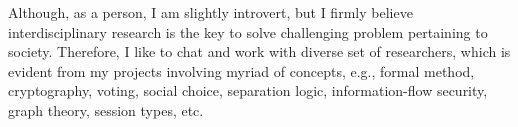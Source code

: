 \documentclass[11pt,a4paper,roman]{moderncv}
\begin{document}
Although, as a person, I am slightly introvert, but I firmly believe interdisciplinary
research is the key to solve challenging problem pertaining to society. Therefore, I like to 
chat and work with diverse set of researchers, which is evident from my projects involving 
myriad of concepts, e.g., formal method, cryptography, voting, social choice, 
separation logic, information-flow security, graph theory, session types, etc. 



\vspace{0.5cm}


\makeletterclosing
\end{document}

